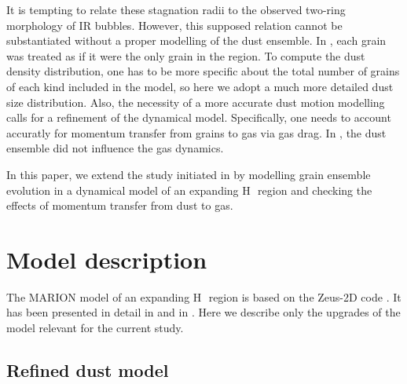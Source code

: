\documentclass[a4paper,fleqn,usenatbib]{mnras}
\newcommand{\hii}    {H\,{\sc{ii}}~}
\begin{document}
It is tempting to relate these stagnation radii to the observed two-ring morphology of IR bubbles. However, this supposed relation cannot be substantiated without a proper modelling of the dust ensemble. In , each grain was treated as if it were the only grain in the region. To compute the dust density distribution, one has to be more specific about the total number of grains of each kind included in the model, so here we adopt a much more detailed dust size distribution. Also, the necessity of a more accurate dust motion modelling calls for a refinement of the dynamical model. Specifically, one needs to account accuratly for momentum transfer from grains to gas via gas drag. In , the dust ensemble did not influence the gas dynamics. 

In this paper, we extend the study initiated in  by modelling grain ensemble evolution in a dynamical model of an expanding \hii region and checking the effects of momentum transfer from dust to gas.

\vspace{-0.5cm}
\section{Model description}\label{sec_model}

The MARION model of an expanding \hii region is based on the Zeus-2D code \citep{stone_92}. It has been presented in detail in \citet{paper_hiimodel} and in . Here we describe only the upgrades of the model relevant for the current study.

\subsection{Refined dust model}
\end{document}
